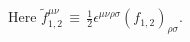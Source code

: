 \documentclass[12pt]{revtex4}
\newcommand{\wt}{\widetilde}
\begin{document}
	Here $ \wt{f}{}_{1,2}^{\mu\nu} \,\equiv\, \frac{1}{2} 
		\epsilon^{\mu\nu\rho\sigma} (f_{1,2})_{\rho\sigma} $.

%

	
\end{document}

